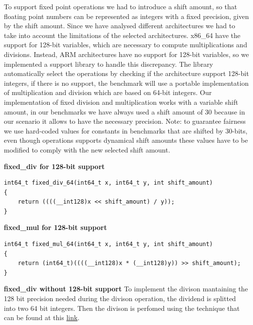 To support fixed point operations we had to introduce a shift amount, so that floating point numbers can be represented as integers with a fixed precision, given by the shift amount.\newline
Since we have analysed different architectures we had to take into account the limitations of the selected architectures.
x86\_64 have the support for 128-bit variables, which are necessary to compute multiplications and divisions. Instead, ARM architectures have no support for 128-bit variables, so we implemented a support library to handle this discrepancy.
The library automatically select the operations by checking if the architecture support 128-bit integers, if there is no support, the benchmark will use a portable implementation of multiplication and division which are based on 64-bit integers.\newline
Our implementation of fixed division and multiplication works with a variable shift amount, in our benchmarks we have always used a shift amount of 30 because in our scenario it allows to have the necessary precision.\newline
Note: to guarantee fairness we use hard-coded values for constants in benchmarks that are shifted by 30-bits, even though operations supports dynamical shift amounts these values have to be modified to comply with the new selected shift amount.\newline

\textbf{fixed\_div for 128-bit support}

\begin{lstlisting}
int64_t fixed_div_64(int64_t x, int64_t y, int shift_amount)
{
    return ((((__int128)x << shift_amount) / y));
}
\end{lstlisting}

\textbf{fixed\_mul for 128-bit support}

\begin{lstlisting}
int64_t fixed_mul_64(int64_t x, int64_t y, int shift_amount)
{
	return (int64_t)((((__int128)x * (__int128)y)) >> shift_amount);
}
\end{lstlisting}

\textbf{fixed\_div without 128-bit support}\newline
To implement the divison mantaining the 128 bit precision needed during the divison operation,  the dividend is splitted into two 64 bit integers. Then the divison is perfomed using the technique that can be found at this \href{https://codereview.stackexchange.com/questions/67962/mostly-portable-128-by-64-bit-division}{link}.

